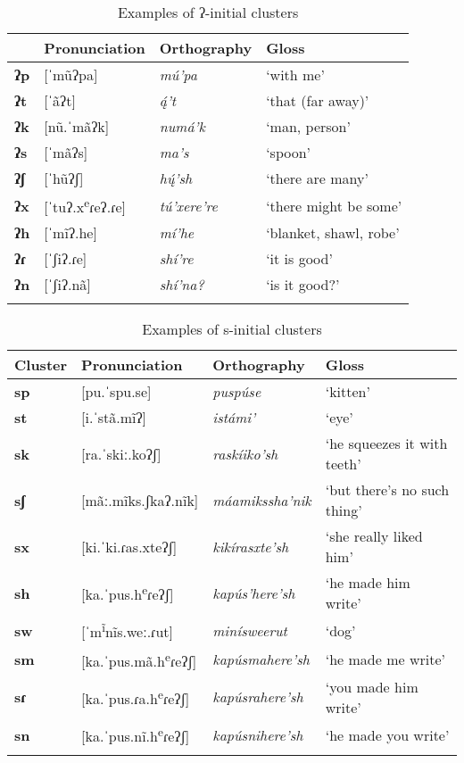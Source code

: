 \begin{table}
\caption{Examples of ʔ-initial clusters}\label{CCexamplesʔ}
\begin{tabularx}{\textwidth}{lQQl}
\lsptoprule
\textbf{~}&\textbf{Pronunciation}&\textbf{Orthography}&\textbf{Gloss}\\
\midrule
\textbf{ʔp}&[ˈmũʔpa]&\textit{mú'pa}&`with me'\\
\textbf{ʔt}&[ˈãʔt] &\textit{ą́'t} &`that (far away)'\\
\textbf{ʔk}&[nũ.ˈmãʔk] &\textit{numá'k} &`man, person'\\
\textbf{ʔs}&[ˈmãʔs] &\textit{ma's} &`spoon'\\
\textbf{ʔʃ}&[ˈhũʔʃ] &\textit{hų́'sh} &`there are many'\\
\textbf{ʔx}&[ˈtuʔ.x\textsuperscript{e}ɾeʔ.ɾe] &\textit{tú'xere're} &`there might be some'\\
\textbf{ʔh}&[ˈmĩʔ.he] &\textit{mí'he} &`blanket, shawl, robe'\\
\textbf{ʔɾ}&[ˈʃiʔ.ɾe] &\textit{shí're} &`it is good'\\
\textbf{ʔn}&[ˈʃiʔ.nã] &\textit{shí'na?} &`is it good?'\\
\lspbottomrule
\end{tabularx}
\end{table}

\begin{table}
\caption{Examples of s-initial clusters}\label{SCexampless}
\begin{tabularx}{\textwidth}{llQl}
\lsptoprule
\textbf{Cluster}&\textbf{Pronunciation}&\textbf{Orthography}&\textbf{Gloss}\\
\midrule
\textbf{sp}&[pu.ˈspu.se]&\textit{puspúse}&`kitten'\\
\textbf{st}&[i.ˈstã.mĩʔ]&\textit{istámi'} &`eye'\\
\textbf{sk}&[ra.ˈskiː.koʔʃ]&\textit{raskíiko'sh}&`he squeezes it with teeth'\\
\textbf{sʃ}&[mãː.mĩks.ʃkaʔ.nĩk]&\textit{máamikssha'nik}&`but there's no such thing'\\
\textbf{sx}&[ki.ˈki.ɾas.xteʔʃ]&\textit{kikírasxte'sh}&`she really liked him'\\
\textbf{sh}&[ka.ˈpus.h\textsuperscript{e}ɾeʔʃ]&\textit{kapús'here'sh}& `he made him write'\\
\textbf{sw}&[ˈm\textsuperscript{ĩ}nĩs.weː.ɾut]&\textit{minísweerut}& `dog'\\
\textbf{sm}&[ka.ˈpus.mã.h\textsuperscript{e}ɾeʔʃ]&\textit{kapúsmahere'sh}& `he made me write'\\
\textbf{sɾ}&[ka.ˈpus.ɾa.h\textsuperscript{e}ɾeʔʃ]&\textit{kapúsrahere'sh}& `you made him write'\\
\textbf{sn}&[ka.ˈpus.nĩ.h\textsuperscript{e}ɾeʔʃ]&\textit{kapúsnihere'sh}& `he made you write'\\
\lspbottomrule
\end{tabularx}
\end{table}


